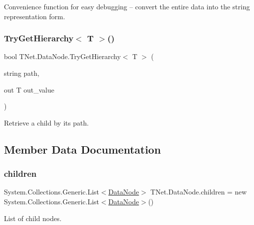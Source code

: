 Convenience function for easy debugging -- convert the entire data into the string representation form. 

\mbox{\label{class_t_net_1_1_data_node_ae42a7365cd1b0b11a3a9e93ab3002f7f}} 
\subsubsection{\texorpdfstring{Try\+Get\+Hierarchy$<$ T $>$()}{TryGetHierarchy< T >()}}
{\footnotesize\ttfamily bool T\+Net.\+Data\+Node.\+Try\+Get\+Hierarchy$<$ T $>$ (\begin{DoxyParamCaption}\item[{string}]{path,  }\item[{out T}]{out\+\_\+value }\end{DoxyParamCaption})}



Retrieve a child by its path. 



\subsection{Member Data Documentation}
\mbox{\label{class_t_net_1_1_data_node_ae70b404163bd692a010aa03505c884da}} 
\subsubsection{\texorpdfstring{children}{children}}
{\footnotesize\ttfamily System.\+Collections.\+Generic.\+List$<$\mbox{\hyperlink{class_t_net_1_1_data_node}{Data\+Node}}$>$ T\+Net.\+Data\+Node.\+children = new System.\+Collections.\+Generic.\+List$<$\mbox{\hyperlink{class_t_net_1_1_data_node}{Data\+Node}}$>$()}



List of child nodes. 

\mbox{\label{class_t_net_1_1_data_node_aaf44a44fb25aad98dd115faf7607858c}} 
